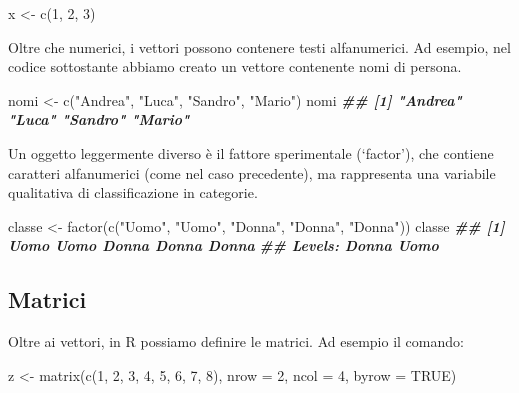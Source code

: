 \documentclass[
  12pt,
]{book}
\newenvironment{Shaded}{\begin{snugshade}}{\end{snugshade}}
\newcommand{\AttributeTok}[1]{\textcolor[rgb]{0.77,0.63,0.00}{#1}}
\newcommand{\ConstantTok}[1]{\textcolor[rgb]{0.00,0.00,0.00}{#1}}
\newcommand{\DecValTok}[1]{\textcolor[rgb]{0.00,0.00,0.81}{#1}}
\newcommand{\DocumentationTok}[1]{\textcolor[rgb]{0.56,0.35,0.01}{\textbf{\textit{#1}}}}
\newcommand{\FunctionTok}[1]{\textcolor[rgb]{0.00,0.00,0.00}{#1}}
\newcommand{\NormalTok}[1]{#1}
\newcommand{\OtherTok}[1]{\textcolor[rgb]{0.56,0.35,0.01}{#1}}
\newcommand{\StringTok}[1]{\textcolor[rgb]{0.31,0.60,0.02}{#1}}
\begin{document}
\begin{Shaded}
\begin{Highlighting}[]
\NormalTok{x }\OtherTok{\textless{}{-}} \FunctionTok{c}\NormalTok{(}\DecValTok{1}\NormalTok{, }\DecValTok{2}\NormalTok{, }\DecValTok{3}\NormalTok{)}
\end{Highlighting}
\end{Shaded}

Oltre che numerici, i vettori possono contenere testi alfanumerici. Ad esempio, nel codice sottostante abbiamo creato un vettore contenente nomi di persona.

\begin{Shaded}
\begin{Highlighting}[]
\NormalTok{nomi }\OtherTok{\textless{}{-}} \FunctionTok{c}\NormalTok{(}\StringTok{"Andrea"}\NormalTok{, }\StringTok{"Luca"}\NormalTok{, }\StringTok{"Sandro"}\NormalTok{, }\StringTok{"Mario"}\NormalTok{)}
\NormalTok{nomi}
\DocumentationTok{\#\# [1] "Andrea" "Luca"   "Sandro" "Mario"}
\end{Highlighting}
\end{Shaded}

Un oggetto leggermente diverso è il fattore sperimentale (`factor'), che contiene caratteri alfanumerici (come nel caso precedente), ma rappresenta una variabile qualitativa di classificazione in categorie.

\begin{Shaded}
\begin{Highlighting}[]
\NormalTok{classe }\OtherTok{\textless{}{-}} \FunctionTok{factor}\NormalTok{(}\FunctionTok{c}\NormalTok{(}\StringTok{"Uomo"}\NormalTok{, }\StringTok{"Uomo"}\NormalTok{, }\StringTok{"Donna"}\NormalTok{, }\StringTok{"Donna"}\NormalTok{, }\StringTok{"Donna"}\NormalTok{))}
\NormalTok{classe}
\DocumentationTok{\#\# [1] Uomo  Uomo  Donna Donna Donna}
\DocumentationTok{\#\# Levels: Donna Uomo}
\end{Highlighting}
\end{Shaded}

\hypertarget{matrici}{%
\subsection{Matrici}\label{matrici}}

Oltre ai vettori, in R possiamo definire le matrici. Ad esempio il comando:

\begin{Shaded}
\begin{Highlighting}[]
\NormalTok{z  }\OtherTok{\textless{}{-}}  \FunctionTok{matrix}\NormalTok{(}\FunctionTok{c}\NormalTok{(}\DecValTok{1}\NormalTok{, }\DecValTok{2}\NormalTok{, }\DecValTok{3}\NormalTok{, }\DecValTok{4}\NormalTok{, }\DecValTok{5}\NormalTok{, }\DecValTok{6}\NormalTok{, }\DecValTok{7}\NormalTok{, }\DecValTok{8}\NormalTok{), }\AttributeTok{nrow =} \DecValTok{2}\NormalTok{, }\AttributeTok{ncol =} \DecValTok{4}\NormalTok{, }
              \AttributeTok{byrow =} \ConstantTok{TRUE}\NormalTok{)}
\end{Highlighting}
\end{Shaded}
\end{document}
